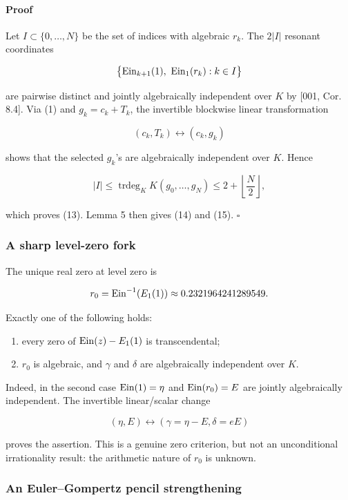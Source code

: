 \paragraph{Proof}

Let \(I\subset\{0,\ldots,N\}\) be the set of indices with algebraic
\(r_k\). The \(2|I|\) resonant coordinates

\[
 \bigl\{\operatorname{Ein}_{k+1}(1),\ \operatorname{Ein}_1(r_k):k\in I\bigr\}
\]

are pairwise distinct and jointly algebraically independent over \(K\) by
{[}001, Cor. 8.4{]}. Via (1) and \(g_k=c_k+T_k\), the invertible blockwise
linear transformation

\[
 (c_k,T_k)\longleftrightarrow(c_k,g_k)
\]

shows that the selected \(g_k\)'s are algebraically independent over
\(K\). Hence

\[
 |I|\le\operatorname{trdeg}_K K(g_0,\ldots,g_N)
 \le2+\left\lfloor\frac N2\right\rfloor,
\]

which proves (13). Lemma 5 then gives (14) and (15). \(\square\)

\subsubsection{A sharp level-zero fork}

The unique real zero at level zero is

\[
 r_0=\operatorname{Ein}^{-1}(E_1(1))\approx0.2321964241289549.
\]

Exactly one of the following holds:

\begin{enumerate}
\def\labelenumi{\arabic{enumi}.}
\tightlist
\item
  every zero of \(\operatorname{Ein}(z)-E_1(1)\) is transcendental;
\item
  \(r_0\) is algebraic, and \(\gamma\) and \(\delta\) are algebraically
  independent over \(K\).
\end{enumerate}

Indeed, in the second case \(\operatorname{Ein}(1)=\eta\) and \(\operatorname{Ein}(r_0)=E\) are jointly
algebraically independent. The invertible linear/scalar change

\[
 (\eta,E)\longleftrightarrow(\gamma=\eta-E,\delta=eE)
\]

proves the assertion. This is a genuine zero criterion, but not an
unconditional irrationality result: the arithmetic nature of \(r_0\) is
unknown.

\subsubsection{An Euler--Gompertz pencil strengthening}

